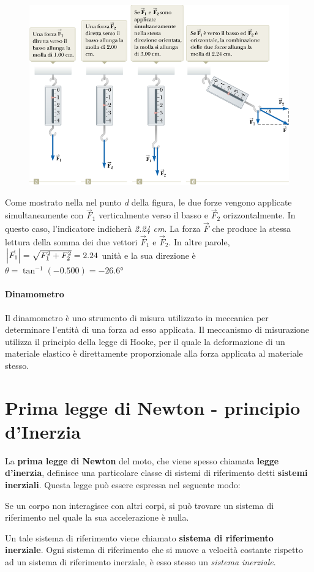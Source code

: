 \documentclass[12pt,oneside]{book}
\begin{document}
\newpage
\begin{figure}[h]
    \centering
    \includegraphics[scale=0.5]{natura_vettoriale_forze}
\end{figure}
Come mostrato nella nel punto \emph{d} della figura, le due forze vengono applicate simultaneamente con $\vec{F}_1$ verticalmente verso
il basso e $\vec{F}_2$ orizzontalmente. In questo caso, l’indicatore indicherà \emph{2.24 cm}. La forza $\vec{F}$ che produce
la stessa lettura della somma dei due vettori $\vec{F}_1$ e $\vec{F}_2$. In altre parole, $\abs{\vec{F}_1} = \sqrt{F_1^2 + F_2^2} = 2.24$
unità e la sua direzione è $\theta = \tan^{-1} (-0.500) = -26.6$°

\paragraph{Dinamometro}
Il dinamometro è uno strumento di misura utilizzato in meccanica per determinare l'entità di una forza ad esso applicata.
Il meccanismo di misurazione utilizza il principio della legge di Hooke, per il quale la deformazione di un materiale elastico è direttamente proporzionale alla forza applicata al materiale stesso.

\newpage
\section{Prima legge di Newton - principio d'Inerzia}
La \textbf{prima legge di Newton} del moto, che viene spesso chiamata \textbf{legge d’inerzia},
definisce una particolare classe di sistemi di riferimento detti \textbf{sistemi inerziali}.
Questa legge può essere espressa nel seguente modo:
\begin{displayquote}
    \centering
    Se un corpo non interagisce con altri corpi, si può trovare un sistema di riferimento nel quale la sua accelerazione è nulla.
\end{displayquote}
Un tale sistema di riferimento viene chiamato \textbf{sistema di riferimento inerziale}.
Ogni sistema di riferimento che si muove a velocità costante rispetto ad un sistema di riferimento inerziale, è esso stesso un \emph{sistema inerziale}.
\end{document}
